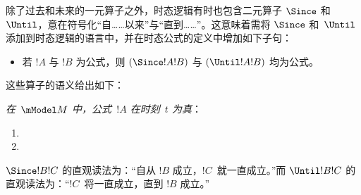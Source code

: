 \documentclass[../../../include/open-logic-section]{subfiles}
\begin{document}


除了过去和未来的一元算子之外，时态逻辑有时也包含二元算子 $\Since $ 和~$\Until$，意在符号化“自……以来”与“直到……”。这意味着需将 $\Since $ 和~$\Until$ 添加到时态逻辑的语言中，并在时态公式的定义中增加如下子句：

\begin{itemize}
\item[] 若 $!A$ 与 $!B$ 为公式，则 $(\Since  !A !B)$ 与
  $(\Until !A !B)$ 均为公式。
\end{itemize}

这些算子的语义给出如下：

\begin{defn}
  \emph{在~$\mModel M$ 中，公式~$!A$ 在时刻~$t$ 为真}：
  \begin{enumerate}
  \item{} 
   \item{} 
  \end{enumerate}
\end{defn}

$\Since  !B !C$ 的直观读法为：“自从 $!B$ 成立，$!C$~就一直成立。”而 $\Until !B !C$ 的直观读法为：“$!C$~将一直成立，直到 $!B$ 成立。”
\end{document}
